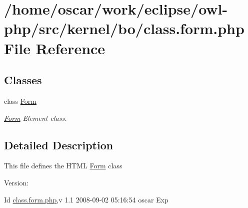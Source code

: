 \hypertarget{class_8form_8php}{
\section{/home/oscar/work/eclipse/owl-php/src/kernel/bo/class.form.php File Reference}
\label{class_8form_8php}
}
\subsection*{Classes}
\begin{CompactItemize}
\item 
class \hyperlink{classForm}{Form}
\begin{CompactList}\small\item\em \hyperlink{classForm}{Form} Element class. \item\end{CompactList}\end{CompactItemize}


\subsection{Detailed Description}
This file defines the HTML \hyperlink{classForm}{Form} class \begin{Desc}
\item[Version:]\end{Desc}
\begin{Desc}
\item[Id]\hyperlink{class_8form_8php}{class.form.php},v 1.1 2008-09-02 05:16:54 oscar Exp \end{Desc}
